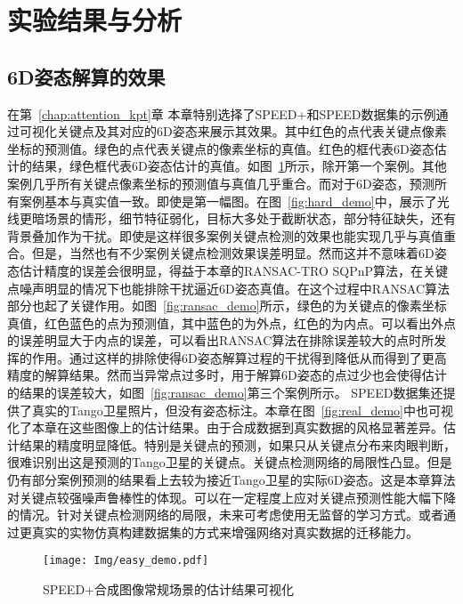 \section{实验结果与分析}
\label{sec:RANSAC-TRO-SQPnP:ExperimentCompare}


\subsection{6D姿态解算的效果}
在第~\ref{chap:attention_kpt}章
本章特别选择了SPEED+和SPEED数据集的示例通过可视化关键点及其对应的6D姿态来展示其效果。其中红色的点代表关键点像素坐标的预测值。绿色的点代表关键点的像素坐标的真值。红色的框代表6D姿态估计的结果，绿色框代表6D姿态估计的真值。如图~\ref{fig:easy_demo}所示，除开第一个案例。其他案例几乎所有关键点像素坐标的预测值与真值几乎重合。而对于6D姿态，预测所有案例基本与真实值一致。即使是第一幅图。在图~\ref{fig:hard_demo}中，展示了光线更暗场景的情形，细节特征弱化，目标大多处于截断状态，部分特征缺失，还有背景叠加作为干扰。即使是这样很多案例关键点检测的效果也能实现几乎与真值重合。但是，当然也有不少案例关键点检测效果误差明显。然而这并不意味着6D姿态估计精度的误差会很明显，得益于本章的RANSAC-TRO SQPnP算法，在关键点噪声明显的情况下也能排除干扰逼近6D姿态真值。在这个过程中RANSAC算法部分也起了关键作用。如图~\ref{fig:ransac_demo}所示，绿色的为关键点的像素坐标真值，红色蓝色的点为预测值，其中蓝色的为外点，红色的为内点。可以看出外点的误差明显大于内点的误差，可以看出RANSAC算法在排除误差较大的点时所发挥的作用。通过这样的排除使得6D姿态解算过程的干扰得到降低从而得到了更高精度的解算结果。然而当异常点过多时，用于解算6D姿态的点过少也会使得估计的结果的误差较大，如图~\ref{fig:ransac_demo}第三个案例所示。
SPEED数据集还提供了真实的Tango卫星照片，但没有姿态标注。本章在图~\ref{fig:real_demo}中也可视化了本章在这些图像上的估计结果。由于合成数据到真实数据的风格显著差异。估计结果的精度明显降低。特别是关键点的预测，如果只从关键点分布来肉眼判断，很难识别出这是预测的Tango卫星的关键点。关键点检测网络的局限性凸显。但是仍有部分案例预测的结果看上去较为接近Tango卫星的实际6D姿态。这是本章算法对关键点较强噪声鲁棒性的体现。可以在一定程度上应对关键点预测性能大幅下降的情况。针对关键点检测网络的局限，未来可考虑使用无监督的学习方式。或者通过更真实的实物仿真构建数据集的方式来增强网络对真实数据的迁移能力。

\begin{figure}[!t] \centering \texttt{[image: Img/easy\_demo.pdf]} \caption{SPEED+合成图像常规场景的估计结果可视化} \label{fig:easy_demo} \end{figure}

